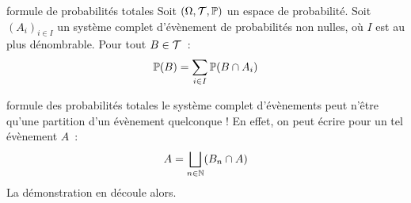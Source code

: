 \begin{theoreme}{}{formule de probabilités totales}
    Soit $(\Omega, \mathcal{T}, \mathbb{P})$ un espace de probabilité. Soit $(A_i)_{i \in I}$ un système complet d'évènement de probabilités non nulles, où $I$ est au plus dénombrable. Pour tout $B \in \mathcal{T}$~:
    $$\mathbb{P}(B) = \sum_{i \in I} \mathbb{P}(B \cap A_i)$$
\end{theoreme}

\begin{remarque}{}{formule des probabilités totales}
    le système complet d'évènements peut n'être qu'une partition d'un évènement quelconque ! En effet, on peut écrire pour un tel évènement $A$~:
    $$A = \bigsqcup_{n\in \mathbb{N}} (B_n \cap A)$$
    La démonstration en découle alors.
\end{remarque}

